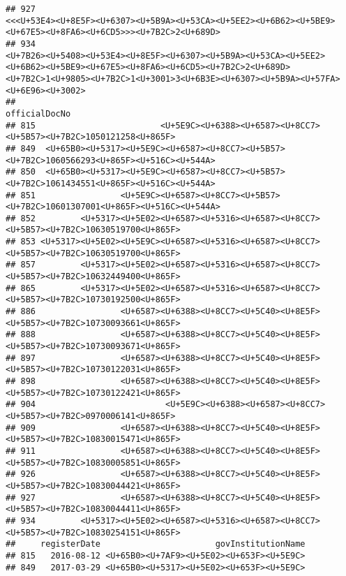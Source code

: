 \documentclass[
]{article}
\begin{document}
\begin{verbatim}
## 927                                                                                                                                                          <<<U+53E4><U+8E5F><U+6307><U+5B9A><U+53CA><U+5EE2><U+6B62><U+5BE9><U+67E5><U+8FA6><U+6CD5>>><U+7B2C>2<U+689D>
## 934                                                           <U+7B26><U+5408><U+53E4><U+8E5F><U+6307><U+5B9A><U+53CA><U+5EE2><U+6B62><U+5BE9><U+67E5><U+8FA6><U+6CD5><U+7B2C>2<U+689D><U+7B2C>1<U+9805><U+7B2C>1<U+3001>3<U+6B3E><U+6307><U+5B9A><U+57FA><U+6E96><U+3002>
##                                                                                   officialDocNo
## 815                         <U+5E9C><U+6388><U+6587><U+8CC7><U+5B57><U+7B2C>1050121258<U+865F> 
## 849  <U+65B0><U+5317><U+5E9C><U+6587><U+8CC7><U+5B57><U+7B2C>1060566293<U+865F><U+516C><U+544A>
## 850  <U+65B0><U+5317><U+5E9C><U+6587><U+8CC7><U+5B57><U+7B2C>1061434551<U+865F><U+516C><U+544A>
## 851                 <U+5E9C><U+6587><U+8CC7><U+5B57><U+7B2C>10601307001<U+865F><U+516C><U+544A>
## 852         <U+5317><U+5E02><U+6587><U+5316><U+6587><U+8CC7><U+5B57><U+7B2C>10630519700<U+865F>
## 853 <U+5317><U+5E02><U+5E9C><U+6587><U+5316><U+6587><U+8CC7><U+5B57><U+7B2C>10630519700<U+865F>
## 857         <U+5317><U+5E02><U+6587><U+5316><U+6587><U+8CC7><U+5B57><U+7B2C>10632449400<U+865F>
## 865         <U+5317><U+5E02><U+6587><U+5316><U+6587><U+8CC7><U+5B57><U+7B2C>10730192500<U+865F>
## 886                 <U+6587><U+6388><U+8CC7><U+5C40><U+8E5F><U+5B57><U+7B2C>10730093661<U+865F>
## 888                 <U+6587><U+6388><U+8CC7><U+5C40><U+8E5F><U+5B57><U+7B2C>10730093671<U+865F>
## 897                 <U+6587><U+6388><U+8CC7><U+5C40><U+8E5F><U+5B57><U+7B2C>10730122031<U+865F>
## 898                 <U+6587><U+6388><U+8CC7><U+5C40><U+8E5F><U+5B57><U+7B2C>10730122421<U+865F>
## 904                          <U+5E9C><U+6388><U+6587><U+8CC7><U+5B57><U+7B2C>0970006141<U+865F>
## 909                 <U+6587><U+6388><U+8CC7><U+5C40><U+8E5F><U+5B57><U+7B2C>10830015471<U+865F>
## 911                 <U+6587><U+6388><U+8CC7><U+5C40><U+8E5F><U+5B57><U+7B2C>10830005851<U+865F>
## 926                 <U+6587><U+6388><U+8CC7><U+5C40><U+8E5F><U+5B57><U+7B2C>10830044421<U+865F>
## 927                 <U+6587><U+6388><U+8CC7><U+5C40><U+8E5F><U+5B57><U+7B2C>10830044411<U+865F>
## 934         <U+5317><U+5E02><U+6587><U+5316><U+6587><U+8CC7><U+5B57><U+7B2C>10830254151<U+865F>
##     registerDate                       govInstitutionName
## 815   2016-08-12 <U+65B0><U+7AF9><U+5E02><U+653F><U+5E9C>
## 849   2017-03-29 <U+65B0><U+5317><U+5E02><U+653F><U+5E9C>

\end{verbatim}
\end{document}
